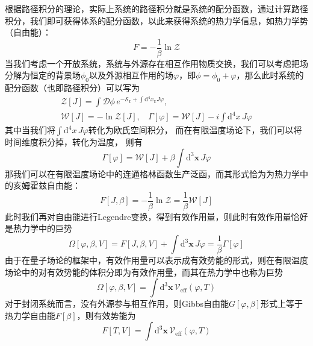 根据路径积分的理论，实际上系统的路径积分就是系统的配分函数，通过计算路径积分，我们即可获得体系的配分函数，以此来获得系统的热力学信息，如热力学势（自由能）：
\begin{equation}
    F = -\frac{1}{\beta}\ln \mathcal{Z}
\end{equation}
当我们考虑一个开放系统，系统与外源存在相互作用物质交换，我们可以考虑把场分解为恒定的背景场$\phi_0$以及外源相互作用的场$\varphi$，即$\phi = \phi_0 + \varphi$，那么此时系统的配分函数（也即路径积分）可以写为
\begin{gather}
    \mathcal{Z}[J] = \int\mathcal{D}\phi\,e^{-\mathcal{S}_\mathbb{E}+\int \mathrm{d}^4x_\mathbb{E} J\varphi},\\\mathcal{W}[J]=-\ln \mathcal{Z}[J],~~~~\Gamma[\varphi] = \mathcal{W}[J]-i\int\mathrm{d}^4x\, J\varphi
\end{gather}
其中当我们将$\int\mathrm{d}^4x\, J\varphi$转化为欧氏空间积分，
而在有限温度场论下，我们可以将时间维度积分掉，转化为温度，
则有
\begin{equation}
    \Gamma[\varphi] = \mathcal{W}[J]+\beta\int\mathrm{d}^3\boldsymbol{x}\, J\varphi
\end{equation}
那我们可以在有限温度场论中的连通格林函数生产泛函，而其形式恰为为热力学中的亥姆霍兹自由能：
\begin{equation}
    F[J,\beta] = -\frac{1}{\beta}\ln\mathcal{Z} = \frac{1}{\beta}\mathcal{W}[J]
\end{equation}
此时我们再对自由能进行Legendre变换，得到有效作用量，则此时有效作用量恰好是热力学中的巨势
\begin{equation}
     \Omega[\varphi,\beta,V] = F[J,\beta,V]  +\int \mathrm{d}^3\boldsymbol{x} \,J\varphi =\frac{1}{\beta}\Gamma[\varphi]
\end{equation}
由于在量子场论的框架中，有效作用量可以表示成有效势能的形式，则在有限温度场论中的对有效势能的体积分即为有效作用量，而其在热力学中也称为巨势
\begin{equation}
    \Omega[\varphi,\beta,V] = \int\mathrm{d}^3\boldsymbol{x}\, \mathscr{V}_\mathrm{eff}(\varphi,T)
\end{equation}
对于封闭系统而言，没有外源参与相互作用，则Gibbs自由能$G[\varphi,\beta]$形式上等于热力学自由能$F[\beta]$，则有效势能为
\begin{equation}
    F[T,V] = \int\mathrm{d}^3\boldsymbol{x}\, \mathscr{V}_\mathrm{eff}(\varphi,T)
\end{equation}




